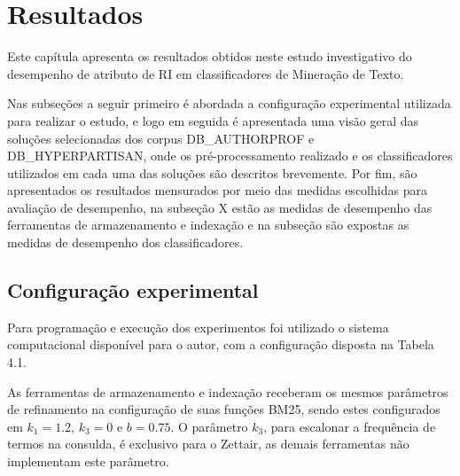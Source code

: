 \chapter{Resultados} \label{ch:Resultados}



Este capítula apresenta os resultados obtidos neste estudo investigativo do desempenho de atributo de RI em classificadores de Mineração de Texto.

Nas subseções a seguir primeiro é abordada a configuração experimental utilizada para realizar o estudo, e logo em seguida é apresentada uma visão geral das soluções selecionadas dos corpus DB\_AUTHORPROF e DB\_HYPERPARTISAN, onde os pré-processamento realizado e os classificadores utilizados em cada uma das soluções são descritos brevemente.
Por fim, são apresentados os resultados mensurados por meio das medidas escolhidas para avaliação de desempenho, na subseção X estão as medidas de desempenho das ferramentas de armazenamento e indexação e na subseção são expostas as medidas de desempenho dos classificadores.


\section{Configuração experimental} \label{sec:resex1}

	Para programação e execução dos experimentos foi utilizado o sistema computacional disponível para o autor, com a configuração disposta na Tabela 4.1.

	As ferramentas de armazenamento e indexação receberam os mesmos parâmetros de refinamento na configuração de suas funções BM25, sendo estes configurados em $k_1 = 1.2$, $k_3 = 0$ e $b = 0.75$.
	O parâmetro $k_3$, para escalonar a frequência de termos na consulda, é exclusivo para o Zettair, as demais ferramentas não implementam este parâmetro.


